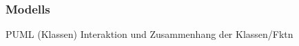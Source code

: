\subsubsection{Modells} \label{subsubsec:Modells}
PUML (Klassen)
Interaktion und Zusammenhang der Klassen/Fktn